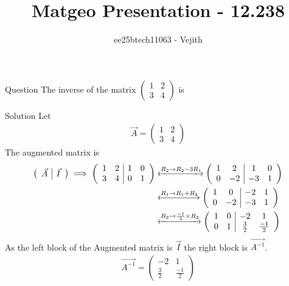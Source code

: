 \documentclass{beamer}
\title{Matgeo Presentation - 12.238}
\author{ee25btech11063 - Vejith}
\numberwithin{equation}{section}
\theoremstyle{remark}
\begin{document}
\frame{\titlepage}
\begin{frame}{Question}
The inverse of the matrix
$\begin{pmatrix}
    1 & 2\\
    3 & 4
\end{pmatrix}$ is
\end{frame}

\begin{frame}{Solution}
    Let 
\begin{align}
    \Vec{A}=\begin{pmatrix}
    1 & 2\\
    3 & 4
\end{pmatrix}
\end{align}
The augmented matrix is 
\begin{align}
    \left(\begin{array}{c|c}
        \Vec{A} & \Vec{I}
\end{array}\right)
\implies 
\left(\begin{array}{cc|cc}
        1 & 2 & 1 & 0\\
        3 & 4 &  0 & 1
\end{array}\right)  &\xleftrightarrow{R_2 \rightarrow R_2-3R_1} \left(\begin{array}{cc|cc}
        1 & 2 & 1 & 0\\
        0 & -2 &  -3 & 1
\end{array}\right)\\
&\xleftrightarrow{R_1 \rightarrow R_1 + R_2} \left(\begin{array}{cc|cc}
        1 & 0 & -2 & 1\\
        0 & -2 &  -3 & 1
\end{array}\right)\\
&\xleftrightarrow{R_2 \rightarrow \frac{-1}{2} \times R_2} \left(\begin{array}{cc|cc}
        1 & 0 & -2 & 1\\
        0 & 1 &  \frac{3}{2} & \frac{-1}{2}
\end{array}\right)
\end{align}
As the left block of the Augmented matrix is $\Vec{I}$ the right block is $\Vec{A^{-1}}$.
\begin{align}
    \Vec{A^{-1}}=\begin{pmatrix}
    -2 & 1\\
    \frac{3}{2} & \frac{-1}{2}
\end{pmatrix}
\end{align}
\end{frame}
\end{document}
